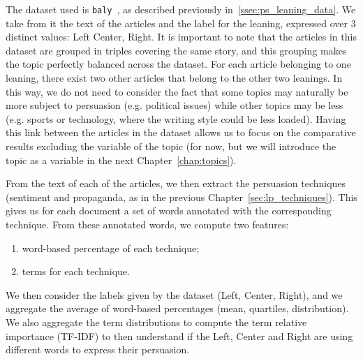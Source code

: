 The dataset used is \texttt{baly}~\citep{baly2020we}, as described previously in~\ref{ssec:ps_leaning_data}.
We take from it the text of the articles and the label for the leaning, expressed over 3 distinct values: Left Center, Right.
It is important to note that the articles in this dataset are grouped in triples covering the same story, and this grouping makes the topic perfectly balanced across the dataset. For each article belonging to one leaning, there exist two other articles that belong to the other two leanings.
In this way, we do not need to consider the fact that some topics may naturally be more subject to persuasion (e.g. political issues) while other topics may be less (e.g. sports or technology, where the writing style could be less loaded).
Having this link between the articles in the dataset allows us to focus on the comparative results excluding the variable of the topic (for now, but we will introduce the topic as a variable in the next Chapter~\ref{chap:topics}).

From the text of each of the articles, we then extract the persuasion techniques (sentiment and propaganda, as in the previous Chapter~\ref{sec:lp_techniques}). This gives us for each document a set of words annotated with the corresponding technique. From these annotated words, we compute two features:
\begin{enumerate}
    \item word-based percentage of each technique;
    \item terms for each technique.
\end{enumerate}



We then consider the labels given by the dataset (Left, Center, Right), and we aggregate the average of word-based percentages (mean, quartiles, distribution). %
We also aggregate the term distributions to compute the term relative importance (TF-IDF) to then understand if the Left, Center and Right are using different words to express their persuasion.

